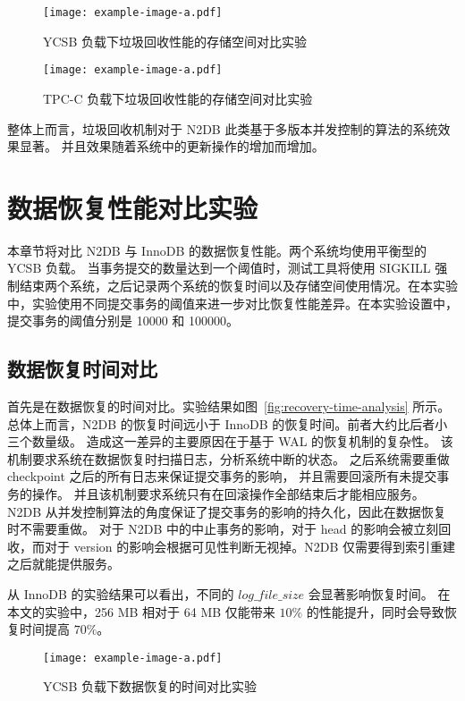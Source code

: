 \begin{figure}
    \centering
    \texttt{[image: example-image-a.pdf]}
    \caption{YCSB 负载下垃圾回收性能的存储空间对比实验}
    \label{fig:gc-storage-ycsb}
\end{figure}

\begin{figure}
    \centering
    \texttt{[image: example-image-a.pdf]}
    \caption{TPC-C 负载下垃圾回收性能的存储空间对比实验}
    \label{fig:gc-storage-tpcc}
\end{figure}

整体上而言，垃圾回收机制对于 N2DB 此类基于多版本并发控制的算法的系统效果显著。
并且效果随着系统中的更新操作的增加而增加。


\section{数据恢复性能对比实验}

本章节将对比 N2DB 与 InnoDB 的数据恢复性能。两个系统均使用平衡型的 YCSB 负载。
当事务提交的数量达到一个阈值时，测试工具将使用 SIGKILL 强制结束两个系统，之后记录两个系统的恢复时间以及存储空间使用情况。在本实验中，实验使用不同提交事务的阈值来进一步对比恢复性能差异。在本实验设置中，提交事务的阈值分别是 10000 和 100000。

\subsection{数据恢复时间对比}

首先是在数据恢复的时间对比。实验结果如图~\ref{fig:recovery-time-analysis} 所示。
总体上而言，N2DB 的恢复时间远小于 InnoDB 的恢复时间。前者大约比后者小三个数量级。
造成这一差异的主要原因在于基于 WAL 的恢复机制的复杂性。
该机制要求系统在数据恢复时扫描日志，分析系统中断的状态。
之后系统需要重做 checkpoint 之后的所有日志来保证提交事务的影响，
并且需要回滚所有未提交事务的操作。
并且该机制要求系统只有在回滚操作全部结束后才能相应服务。
N2DB 从并发控制算法的角度保证了提交事务的影响的持久化，因此在数据恢复时不需要重做。
对于 N2DB 中的中止事务的影响，对于 head 的影响会被立刻回收，而对于 version 的影响会根据可见性判断无视掉。N2DB 仅需要得到索引重建之后就能提供服务。

从 InnoDB 的实验结果可以看出，不同的 $log\_file\_size$ 会显著影响恢复时间。
在本文的实验中，256 MB 相对于 64 MB 仅能带来 $10\%$ 的性能提升，同时会导致恢复时间提高 $70\%$。


\begin{figure}
    \centering
    \texttt{[image: example-image-a.pdf]}
    \caption{YCSB 负载下数据恢复的时间对比实验}
    \label{fig:recovery-time-ycsb}
\end{figure}


